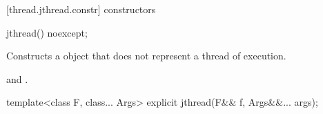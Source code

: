[thread.jthread.constr]{ constructors}

%
\begin{itemdecl}
jthread() noexcept;
\end{itemdecl}
\begin{itemdescr}
  \pnum\effects Constructs a  object that does not represent a thread of execution.

  \pnum\postconditions {}
        {\color{diffcolor} and }.
\end{itemdescr}

%
\begin{itemdecl}
template<class F, class... Args> explicit jthread(F&& f, Args&&... args);
\end{itemdecl}
